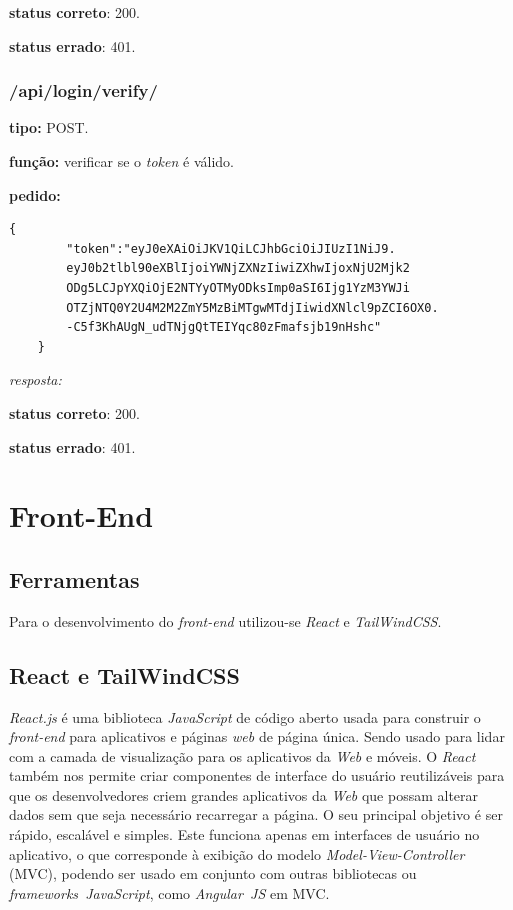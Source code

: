 \documentclass[11pt,a4paper]{report}
\begin{document}
\textbf{status correto}: 200.

\textbf{status errado}: 401.

\subsection{/api/login/verify/}

\textbf{tipo:} POST.

\textbf{função:} verificar se o \emph{token} é válido.

\textbf{pedido:}

\begin{lstlisting}[style = code]
    {
        "token":"eyJ0eXAiOiJKV1QiLCJhbGciOiJIUzI1NiJ9.
        eyJ0b2tlbl90eXBlIjoiYWNjZXNzIiwiZXhwIjoxNjU2Mjk2
        ODg5LCJpYXQiOjE2NTYyOTMyODksImp0aSI6Ijg1YzM3YWJi
        OTZjNTQ0Y2U4M2M2ZmY5MzBiMTgwMTdjIiwidXNlcl9pZCI6OX0.
        -C5f3KhAUgN_udTNjgQtTEIYqc80zFmafsjb19nHshc" 
    }
\end{lstlisting}

\emph{resposta:}

\textbf{status correto}: 200.

\textbf{status errado}: 401.

\newpage

\chapter{Front-End}

\section{Ferramentas}
Para o desenvolvimento do  \emph{front-end} utilizou-se \emph{React} e \emph{TailWindCSS}.

\section{React e TailWindCSS}

\emph{React.js} é uma biblioteca \emph{JavaScript} de código aberto usada para construir o \emph{front-end} para aplicativos e páginas \emph{web} de página única. Sendo usado para lidar com a camada de visualização para os aplicativos da \emph{Web} e móveis. O \emph{React} também nos permite criar componentes de interface do usuário reutilizáveis para que os desenvolvedores criem grandes aplicativos da \emph{Web} que possam alterar dados sem que seja necessário recarregar a página. O seu principal objetivo é ser rápido, escalável e simples. Este funciona apenas em interfaces de usuário no aplicativo, o que corresponde à exibição do modelo \emph{Model-View-Controller} (MVC), podendo ser usado em conjunto com outras bibliotecas ou \emph{frameworks\ JavaScript}, como \emph{Angular\ JS} em MVC.
\end{document}
